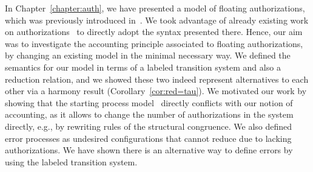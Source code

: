 In Chapter~\ref{chapter:auth}, we have presented a model of floating authorizations, 
which was previously introduced in~\cite{pantovic2018calculus, PROKIC2019136}. 
We took advantage of already existing work on authorizations~\cite{clar:eke} to directly adopt the syntax presented there. Hence, our aim was to investigate the accounting principle associated to floating authorizations, by changing an existing model in the minimal necessary way.
We defined the semantics for our model in terms of a labeled transition system and also a reduction relation, and we showed these two indeed represent alternatives to each other via a harmony result (Corollary~\ref{cor:red=tau}). We motivated our work by showing that the starting process model~\cite{clar:eke} directly conflicts with our notion of accounting, as it allows to change the number of authorizations in the system directly, e.g., by rewriting rules of the structural congruence. 
We also defined error processes as undesired configurations that cannot reduce due to lacking authorizations. We have shown there is an alternative way to define errors by using the labeled transition system.

